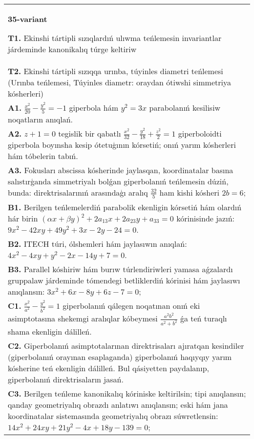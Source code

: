 \documentclass{article}
\begin{document}
\begin{tabular}{m{17cm}}
\textbf{35-variant}
\newline

\textbf{T1.} Ekinshi tártipli sızıqlardıń ulıwma teńlemesin invariantlar járdeminde kanonikalıq túrge keltiriw \\
\textbf{T2.} Ekinshi tártipli sızıqqa urınba, túyinles diametri teńlemesi (Urınba teńlemesi, Túyinles diametr: oraydan ótiwshi simmetriya kósherleri) \\
\textbf{A1.} $\frac{x^2}{20}-\frac{y^2}{5}=-1$ giperbola hám $y^2=3 x$ parabolanıń kesilisiw noqatların anıqlań. \\
\textbf{A2.} $z+1=0$ tegislik bir qabatlı $\frac{x^2}{32}-\frac{y^2}{18}+\frac{z^2}{2}=1$ giperboloidti giperbola boyınsha kesip ótetuģının kórsetiń; onıń yarım kósherleri hám tóbelerin tabıń. \\
\textbf{A3.} Fokusları abscissa kósherinde jaylasqan, koordinatalar basına salıstırģanda simmetriyalı bolǵan giperbolanıń teńlemesin dúziń, bunda: direktrisalarınıń arasındaģı aralıq $\frac{32}{5}$ ham kishi kósheri $2 b=6$; \\
\textbf{B1.} Berilgen teńlemelerdiń parabolik ekenligin kórsetiń hám olardıń hár birin $(\alpha x+\beta y)^2+2 a_{13} x+2 a_{23} y+a_{33}=0$ kórinisinde jazıń:  $9 x^2-42 x y+49 y^2+3 x-2 y-24=0$. \\
\textbf{B2.} ITECH túri, ólshemleri hám jaylasıwın anıqlań: $4 x^2-4 x y+y^2-2 x-14 y+7=0$. \\
\textbf{B3.} Parallel kóshiriw hám burıw túrlendiriwleri yamasa aǵzalardı gruppalaw járdeminde tómendegi betliklerdiń kórinisi hám jaylasıwı anıqlansın: $3 x^2+6 x-8 y+6 z-7=0$; \\
\textbf{C1.} $\frac{x^2}{a^2}-\frac{y^2}{b^2}=1$ giperbolanıń qálegen noqatınan onıń eki asimptotasına shekemgi aralıqlar kóbeymesi $\frac{a^2 b^2}{a^2+b^2}$ ǵa teń turaqlı shama ekenligin dálilleń. \\
\textbf{C2.} Giperbolanıń asimptotalarınan direktrisaları ajıratqan kesindiler (giperbolanıń orayınan esaplaganda) giperbolanıń haqıyqıy yarım kósherine teń ekenligin dálilleń. Bul qásiyetten paydalanıp, giperbolanıń direktrisaların jasań. \\
\textbf{C3.} Berilgen teńleme kanonikalıq kóriniske keltirilsin; tipi anıqlansın; qanday geometriyalıq obrazdı anlatıwı anıqlansın; eski hám jana koordinatalar sistemasında geometriyalıq obrazı súwretlensin: $14 x^2+24 x y+21 y^2-4 x+18 y-139=0$; \\

\end{tabular}
\vspace{1cm}
\end{document}
